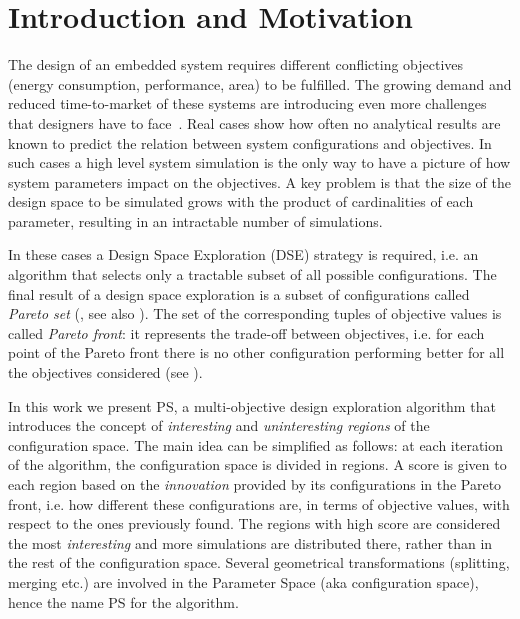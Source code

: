 
\section{Introduction and Motivation}

The design of an embedded system requires different conflicting
objectives (energy consumption, performance, area) to be fulfilled.
The growing demand and reduced time-to-market of these systems are
introducing even more challenges that designers have to
face~\cite{wsts}.
Real cases show how
often no analytical results are known to predict the relation between
system configurations and objectives. In such cases a high level
system simulation is the only way to have a picture of how system
parameters impact on the objectives.  A key problem is that the size
of the design space to be simulated grows with the product of
cardinalities of each parameter, resulting in an intractable number
of simulations. 

In these cases a Design Space Exploration (DSE) strategy is required,
i.e. an algorithm that selects only a tractable subset of all possible
configurations.  The final result of a design space exploration is a
subset of configurations called \emph{Pareto set} (\cite{pareto},
see also ). The set of the corresponding tuples of objective values is called \emph{Pareto front}: it represents the trade-off between objectives,
i.e.  for each point of the Pareto front there is no other
configuration performing better for all the objectives considered (see
).


In this work we present PS, a multi-objective design exploration
algorithm that introduces the concept of \emph{interesting} and
\emph{uninteresting regions} of the configuration space.  The main
idea can be simplified as follows: at each iteration of the algorithm,
the configuration space is divided in regions. A score is given to
each region based on the \emph{innovation} provided by its
configurations in the Pareto front, i.e. how different these configurations are, in terms of objective values, with respect to the ones previously found. The regions with high score are considered the most \emph{interesting} and more simulations are distributed there, rather than in the rest of the configuration space.
Several geometrical transformations (splitting, merging etc.) are
involved in the Parameter Space (aka configuration space), hence
the name PS for the algorithm.


